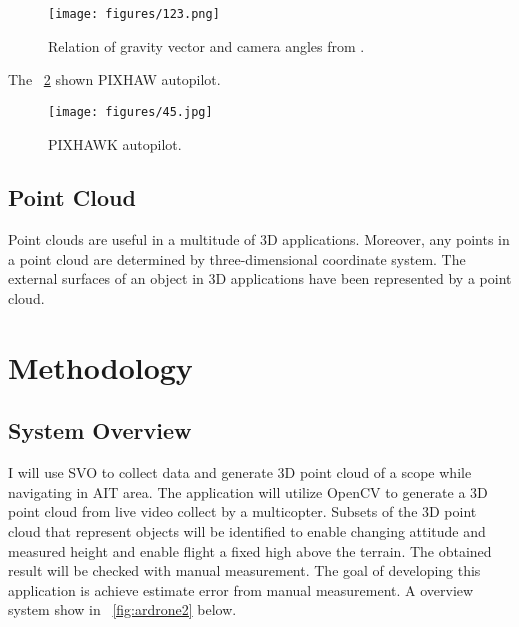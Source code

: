 \documentclass[12pt, a4paper]{aitthesis}
\begin{document}
\begin{figure}[t]
\begin{center}
	\texttt{[image: figures/123.png]}
	\caption[Relation of gravity vector and camera angles]{Relation of gravity vector and camera angles from .} \label{fig:ardrone5}
\end{center}
\end{figure}
\FloatBarrier
The \figurename~\ref{fig:ardrone1} shown PIXHAW autopilot.
\begin{figure}[t]
\begin{center}
	\texttt{[image: figures/45.jpg]}
	\caption[PIXHAWK autopilot]{PIXHAWK autopilot.} \label{fig:ardrone1}
\end{center}
\end{figure}


\FloatBarrier



\section{Point Cloud}

Point clouds are useful in a multitude of 3D applications. Moreover, any points in a point cloud are determined by three-dimensional coordinate system. The external surfaces of an object in 3D applications have been represented by a point cloud.

\FloatBarrier
%
\chapter{Methodology} \label{methodology}

\section{System Overview}
I will use SVO to collect data and generate 3D point cloud of a scope while navigating in AIT area. The application will utilize OpenCV to generate a 3D point cloud from live video collect by a multicopter. Subsets of the 3D point cloud that represent objects will be identified to enable changing attitude and measured height and enable flight a fixed high above the terrain. The obtained result will be checked with manual measurement. The goal of developing this application is achieve estimate error from manual measurement. A overview system show in \figurename~\ref{fig:ardrone2} below.
\end{document}
